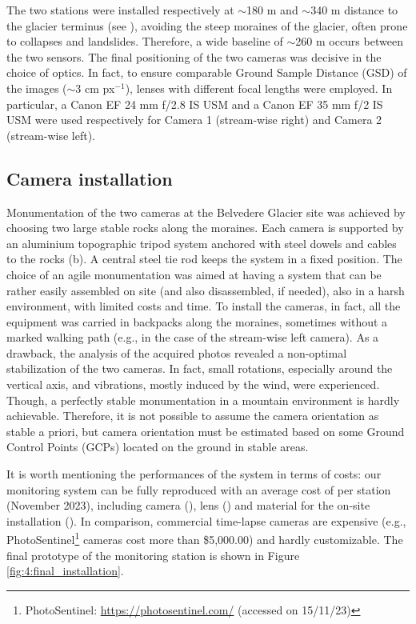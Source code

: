 The two stations were installed respectively at $\sim$180 m and $\sim$340 m distance to
the glacier terminus (see ), avoiding the steep moraines
of the glacier, often prone to collapses and landslides. Therefore, a wide baseline of
$\sim$260 m occurs between the two sensors.
The final positioning of the two cameras was decisive in the choice of optics.
In fact, to ensure comparable Ground Sample Distance (GSD) of the images ($\sim$3 cm
px$^{-1}$), lenses with different focal lengths were employed.
In particular, a Canon EF 24 mm f/2.8 IS USM and a Canon EF 35 mm f/2 IS USM were used
respectively for Camera 1 (stream-wise right) and Camera 2 (stream-wise left).

\subsection{Camera installation}\label{Monumentation}

Monumentation of the two cameras at the Belvedere Glacier site was achieved by choosing
two large stable rocks along the moraines.
Each camera is supported by an aluminium topographic tripod system anchored with steel
dowels and cables to the rocks (b).
A central steel tie rod keeps the system in a fixed position.
The choice of an agile monumentation was aimed at having a system that can be rather
easily assembled on site (and also disassembled, if needed), also in a harsh environment,
with limited costs and time.
To install the cameras, in fact, all the equipment was carried in backpacks along the
moraines, sometimes without a marked walking path (e.g., in the case of the stream-wise
left camera).
As a drawback, the analysis of the acquired photos revealed a non-optimal stabilization
of the two cameras.
In fact, small rotations, especially around the vertical axis, and vibrations, mostly
induced by the wind, were experienced.
Though, a perfectly stable monumentation in a mountain environment is hardly achievable.
Therefore, it is not possible to assume the camera orientation as stable a priori, but
camera orientation must be estimated based on some Ground Control Points (GCPs) located
on the ground in stable areas.

It is worth mentioning the performances of the system in terms of costs: our  monitoring
system can be fully reproduced with an average cost of  per station
(November 2023), including camera (), lens () and material for
the on-site installation ().
In comparison, commercial time-lapse cameras are expensive
(e.g., PhotoSentinel\footnote{PhotoSentinel: \url{https://photosentinel.com/} (accessed
  on 15/11/23)} cameras cost more than \$5,000.00) and hardly customizable.
The final prototype of the monitoring station is shown in Figure
\ref{fig:4:final_installation}.

